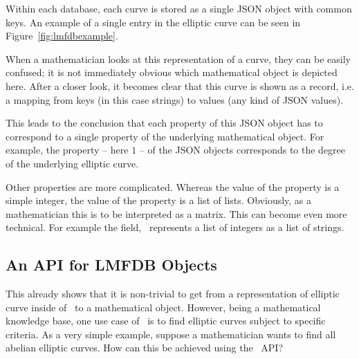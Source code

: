 Within each database, each curve is stored as a single JSON object with common keys. 
An example of a single entry in the elliptic curve can be seen in Figure~\ref{fig:lmfdbexample}.

When a mathematician looks at this representation of a curve, they can be easily confused; it is not immediately obvious which mathematical object is depicted here. 
After a closer look, it becomes clear that this curve is shown as a record, i.e. a mapping from keys (in this case strings) to values (any kind of JSON values). 

This leads to the conclusion that each property of this JSON object has to correspond to a single property of the underlying mathematical object. 
For example, the  property -- here $1$ -- of the JSON objects corresponds to the degree of the underlying elliptic curve. 

Other properties are more complicated. 
Whereas the value of the  property is a simple integer, the value of the  property is a list of lists. 
Obviously, as a mathematician this is to be interpreted as a matrix. 
This can become even more technical. 
For example the  field, \lmfdb\ represents a list of integers as a list of strings.

\subsection{An API for LMFDB Objects}\label{sec:sota:api}

This already shows that it is non-trivial to get from a representation of elliptic curve inside of \lmfdb\ to a mathematical object. 
However, being a mathematical knowledge base, one use case of \lmfdb\ is to find elliptic curves subject to specific criteria. 
As a very simple example, suppose a mathematician wants to find all abelian elliptic curves. 
How can this be achieved using the \lmfdb\ API?

